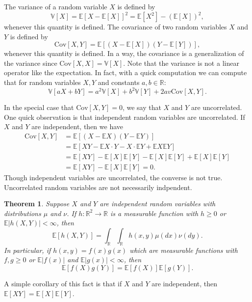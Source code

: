 \documentclass[12pt]{article}
\newcommand{\bbR}{\mathbb{R}}
\newcommand{\Expect}{\mathbb{E}}
\newcommand{\Var}{\mathbb{V}}
\newcommand{\Cov}{\text{Cov}}
\newcommand{\abs}[1]{ \left| #1 \right| }
\newtheorem{thm}{Theorem}[section]
\theoremstyle{definition}
\theoremstyle{remark}
\numberwithin{equation}{section}
\begin{document}
 The variance of a random variable $X$ is defined by
 \begin{equation}
   \Var[X] = \Expect[X-\Expect[X]]^2 = \Expect[X^2] - (\Expect [X])^2,
 \end{equation} 
 whenever this quantity is defined. The covariance of two random variables $X$ and $Y$ is defined by
 \begin{equation}
   \Cov[X,Y] = \Expect[ (X - \Expect[X])(Y - \Expect[Y]) ],
 \end{equation}
 whenever this quantity is defined. In a way, the covariance is a generalization of the variance since $\Cov[X,X] = \Var[X]$. Note that the variance is not a linear operator like the expectation. In fact, with a quick computation we can compute that for random variables $X,Y$ and constants $a,b\in\bbR$:
 \begin{equation}
   \Var[aX + bY] = a^2 \Var[X] + b^2 \Var[Y] + 2av\Cov[X,Y].
 \end{equation}

 In the special case that $\Cov[X,Y]=0$, we say that $X$ and $Y$ are uncorrelated. One quick observation is that independent random variables are uncorrelated. If $X$ and $Y$ are independent, then we have
 \begin{align}
   \Cov[X,Y] &= \Expect[ (X-\Expect X)(Y - \Expect Y) ]\\
             &= \Expect[ XY - \Expect X \cdot Y - X\cdot \Expect Y + \Expect X \Expect Y ]\\
             &= \Expect[XY] - \Expect[X]\Expect[Y] - \Expect[X]\Expect[Y] + \Expect[X]\Expect[Y]\\
             &= \Expect[XY] - \Expect[X]\Expect[Y] = 0.
 \end{align}
Though independent variables are uncorrelated, the converse is not true. Uncorrelated random variables are not necessarily indpendent.


\begin{thm}
  Suppose $X$ and $Y$ are independent random variables with distributions $\mu$ and $\nu$. If $h:\bbR^2\to\bbR$ is a measurable function with $h\geq 0$ or $\Expect\abs{h(X,Y)}<\infty$, then
  \begin{equation}
    \Expect[ h(X,Y) ] = \int_{\bbR}\int_{\bbR} h(x,y)\mu(dx)\nu(dy).
  \end{equation}
  In particular, if $h(x,y) = f(x)g(x)$ which are measurable functions with $f,g\geq 0$ or $\Expect\abs{f(x)}$ and $\Expect\abs{g(x)}<\infty$, then
  \begin{equation}
    \Expect[f(X)g(Y)] = \Expect[f(X)]\Expect[g(Y)].
  \end{equation}
\end{thm}
A simple corollary of this fact is that if $X$ and $Y$ are independent, then $\Expect[XY] = \Expect[X]\Expect[Y]$.
\end{document}
